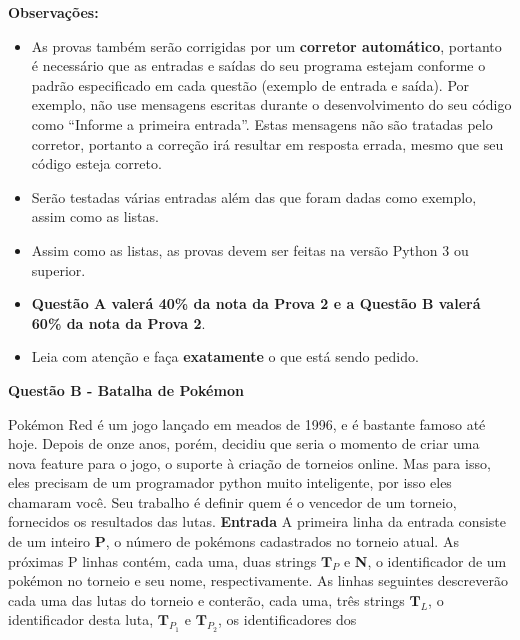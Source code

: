 \documentclass[a4paper, 12pt]{article}
\begin{document}
\textbf{{\large Observações:}}
\begin{itemize}
	\item As provas também serão corrigidas por um \textbf{corretor automático}, portanto é necessário que as entradas e saídas do seu programa estejam conforme o padrão especificado em cada questão (exemplo de entrada e saída). Por exemplo, não use mensagens escritas durante o desenvolvimento do seu código como “Informe a primeira entrada”. Estas mensagens não são tratadas pelo corretor, portanto a correção irá resultar em resposta errada, mesmo que seu código esteja correto.
	\item Serão testadas várias entradas além das que foram dadas como exemplo, assim como as listas.
	\item Assim como as listas, as provas devem ser feitas na versão Python 3 ou superior.
	\item \textbf{Questão A valerá 40\% da nota da Prova 2 e a Questão B valerá 60\% da nota da Prova 2}.
	\item Leia com atenção e faça \textbf{exatamente} o que está sendo pedido.
\end{itemize}
\newpage %
\begin{center}
\textbf{{\Large Questão B - Batalha de Pokémon}}
\end{center}
\vspace{5pt}
Pokémon Red é um jogo lançado em meados de 1996, e é bastante famoso até
hoje. Depois de onze anos, porém, decidiu que seria o momento de criar uma nova
feature para o jogo, o suporte à criação de torneios online. \newline \newline Mas para
isso, eles precisam de um programador python muito inteligente, por isso eles
chamaram você. Seu trabalho é definir quem é o vencedor de um torneio, fornecidos os resultados
das lutas. \newline \newline
\textbf{{\large Entrada}} \newline
A primeira linha da entrada consiste de um inteiro \textbf{P}, o número de pokémons
cadastrados no torneio atual. \newline
As próximas P linhas contém, cada uma, duas strings $\textbf{T}_P$ e \textbf{N}, o identificador de um pokémon no torneio e seu nome, respectivamente. \newline
As linhas seguintes descreverão cada uma das lutas do torneio e conterão, cada
uma, três strings $\textbf{T}_L$, o identificador desta luta, $\textbf{T}_{P_1}$ e $\textbf{T}_{P_2}$, os identificadores dos
\end{document}
